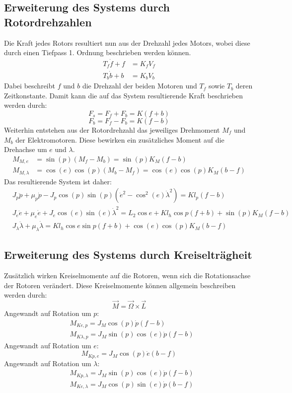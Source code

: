 \documentclass{article}
\begin{document}
	\subsection{Erweiterung des Systems durch Rotordrehzahlen}
	Die Kraft jedes Rotors resultiert nun aus der Drehzahl jedes Motors, wobei diese durch einen Tiefpass 1. Ordnung beschrieben werden können.
	\begin{align}
	T_f \dot{f} + f &= K_f V_f\\
	T_b \dot{b} + b &= K_b V_b
	\end{align}
	Dabei beschreibt $f$ und $b$ die Drehzahl der beiden Motoren und $T_f$ sowie $T_b$ deren Zeitkonstante.
	Damit kann die auf das System resultierende Kraft beschrieben werden durch:
	\begin{equation}
	F_s = F_f + F_b = K (f + b)
	\end{equation}
	\begin{equation}
	F_b = F_f - F_b = K (f - b)
	\end{equation}
	Weiterhin entstehen aus der Rotordrehzahl das jeweiliges Drehmoment $M_f$ und $M_b$ der Elektromotoren. Diese bewirken ein zusätzliches Moment auf die Drehachse um $e$ und $\lambda$.
	\begin{align}
	M_{M,e} &= \sin (p) (M_f - M_b) =\sin (p) K_M (f-b) \\
	M_{M,\lambda} &= \cos (e) \cos (p) (M_b - M_f) =\cos (e) \cos (p) K_M (b-f)
	\end{align}
	Das resultierende System ist daher:
	\begin{align}
	&J_p \ddot{p} + \mu_p \dot{p} - J_p \cos (p) \sin (p) (\dot{e}^2- \cos^2 (e) \dot{\lambda}^2) = K l_p (f - b)\\
	&J_e\ddot{e} + \mu_e \dot{e} + J_e \cos (e) \sin (e) \dot{\lambda}^2 
	= L_2 \cos e + K l_h \cos p (f + b) + \sin (p) K_M (f-b)\\
	&J_\lambda \ddot{\lambda} + \mu_\lambda \dot{\lambda} = K l_h \cos e \sin p (f + b) +\cos (e) \cos (p) K_M (b-f)
	\end{align}
	\subsection{Erweiterung des Systems durch Kreiselträgheit}
	Zusätzlich wirken Kreiselmomente auf die Rotoren, wenn sich die Rotationsachse der Rotoren verändert. Diese Kreiselmomente können allgemein beschreiben werden durch:
	\begin{equation}
	\vec{M} = \vec{\Omega} \times \vec{L}
	\end{equation}	
	Angewandt auf Rotation um $p$:
	\begin{align}
	&M_{Ke,p} = J_M \cos (p) \dot{p}(f-b)\\
	&M_{K\lambda,p} = J_M \sin (p) \cos (e) \dot{p}(f-b)
	\end{align}
	Angewandt auf Rotation um $e$:
	\begin{equation}
	M_{Kp,e} = J_M \cos (p) \dot{e}(b-f)
	\end{equation}
	Angewandt auf Rotation um $\lambda$:
	\begin{align}
	&M_{Kp,\lambda} = J_M \sin (p) \cos (e) \dot{p}(f-b)\\
	&M_{Ke,\lambda} = J_M \cos (p) \sin (e) \dot{p}(b-f)
	\end{align}
		
\end{document}
